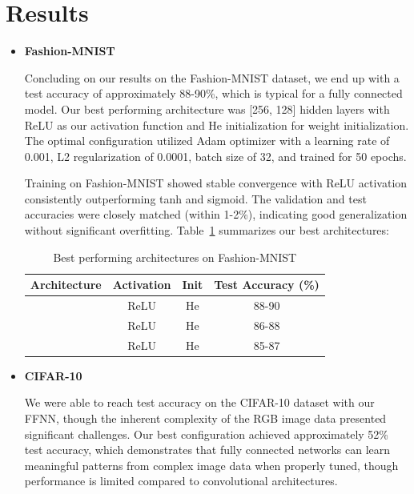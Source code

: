 
\section{Results}
\label{sec:majhead}

\begin{itemize}
    \item \textbf{Fashion-MNIST}
    
    Concluding on our results on the Fashion-MNIST dataset, we end up with a test accuracy of approximately 88-90\%, which is typical for a fully connected model. Our best performing architecture was [256, 128] hidden layers with ReLU as our activation function and He initialization for weight initialization. The optimal configuration utilized Adam optimizer with a learning rate of 0.001, L2 regularization of 0.0001, batch size of 32, and trained for 50 epochs.
    
    Training on Fashion-MNIST showed stable convergence with ReLU activation consistently outperforming tanh and sigmoid. The validation and test accuracies were closely matched (within 1-2\%), indicating good generalization without significant overfitting. Table~\ref{tab:fashion_results} summarizes our best architectures:
    
    \begin{table}[htb]
    \centering
    \caption{Best performing architectures on Fashion-MNIST}
    \label{tab:fashion_results}
    \begin{tabular}{lccc}
    \hline
    Architecture & Activation & Init & Test Accuracy (\%) \\
    \hline
    [256, 128] & ReLU & He & 88-90 \\
    [128, 64] & ReLU & He & 86-88 \\
    [512, 256] & ReLU & He & 85-87 \\
    \hline
    \end{tabular}
    \end{table}

    \item \textbf{CIFAR-10}
    
    We were able to reach test accuracy on the CIFAR-10 dataset with our FFNN, though the inherent complexity of the RGB image data presented significant challenges. Our best configuration achieved approximately 52\% test accuracy, which demonstrates that fully connected networks can learn meaningful patterns from complex image data when properly tuned, though performance is limited compared to convolutional architectures.
    

\end{itemize}
